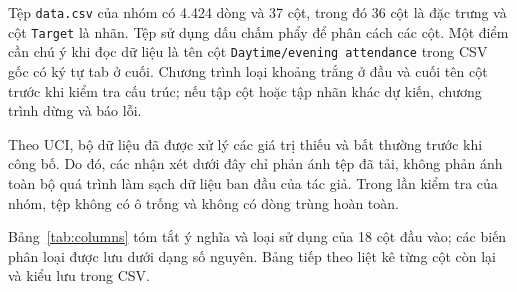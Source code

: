 Tệp \texttt{data.csv} của nhóm có 4.424 dòng và 37 cột, trong đó 36 cột là đặc trưng và cột \texttt{Target} là nhãn. Tệp sử dụng dấu chấm phẩy để phân cách các cột. Một điểm cần chú ý khi đọc dữ liệu là tên cột \texttt{Daytime/evening attendance} trong CSV gốc có ký tự tab ở cuối. Chương trình loại khoảng trắng ở đầu và cuối tên cột trước khi kiểm tra cấu trúc; nếu tập cột hoặc tập nhãn khác dự kiến, chương trình dừng và báo lỗi.

Theo UCI, bộ dữ liệu đã được xử lý các giá trị thiếu và bất thường trước khi công bố. Do đó, các nhận xét dưới đây chỉ phản ánh tệp đã tải, không phản ánh toàn bộ quá trình làm sạch dữ liệu ban đầu của tác giả. Trong lần kiểm tra của nhóm, tệp không có ô trống và không có dòng trùng hoàn toàn.

Bảng~\ref{tab:columns} tóm tắt ý nghĩa và loại sử dụng của 18 cột đầu vào; các biến phân loại được lưu dưới dạng số nguyên. Bảng tiếp theo liệt kê từng cột còn lại và kiểu lưu trong CSV.

